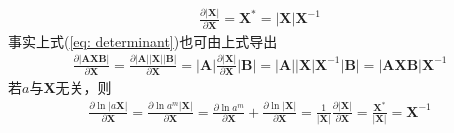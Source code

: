 \documentclass{ctexart}
\theoremstyle{definition}
\def \Av {\mathbf{A}}
\def \Bv {\mathbf{B}}
\def \Xv {\mathbf{X}}
\begin{document}
\begin{align*}
    \frac{\partial |\Xv|}{\partial \Xv} = \Xv^* = |\Xv| \Xv^{-1}
\end{align*}
事实上式(\ref{eq: determinant})也可由上式导出
\begin{align*}
    \frac{\partial |\Av \Xv \Bv|}{\partial \Xv} = \frac{\partial |\Av| |\Xv| |\Bv|}{\partial \Xv} = |\Av| \frac{\partial |\Xv|}{\partial \Xv} |\Bv| = |\Av| |\Xv| \Xv^{-1} |\Bv| = |\Av \Xv \Bv| \Xv^{-1}
\end{align*}
若$a$与$\Xv$无关，则
\begin{align*}
    \frac{\partial \ln |a \Xv|}{\partial \Xv} = \frac{\partial \ln a^m |\Xv|}{\partial \Xv} = \frac{\partial \ln a^m}{\partial \Xv} + \frac{\partial \ln |\Xv|}{\partial \Xv} = \frac{1}{|\Xv|} \frac{\partial |\Xv|}{\partial \Xv} = \frac{\Xv^*}{|\Xv|} = \Xv^{-1}
\end{align*}
\end{document}
